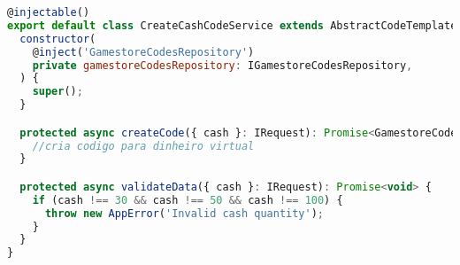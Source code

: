 \begin{lstlisting}[language=JavaScript, caption={Cadastro de Códigos para Dinheiro Virtual},captionpos=b, label=alg:ocpexample]
@injectable()
export default class CreateCashCodeService extends AbstractCodeTemplate {
  constructor(
    @inject('GamestoreCodesRepository')
    private gamestoreCodesRepository: IGamestoreCodesRepository,
  ) {
    super();
  }

  protected async createCode({ cash }: IRequest): Promise<GamestoreCode> {
    //cria codigo para dinheiro virtual
  }

  protected async validateData({ cash }: IRequest): Promise<void> {
    if (cash !== 30 && cash !== 50 && cash !== 100) {
      throw new AppError('Invalid cash quantity');
    }
  }
}
\end{lstlisting}